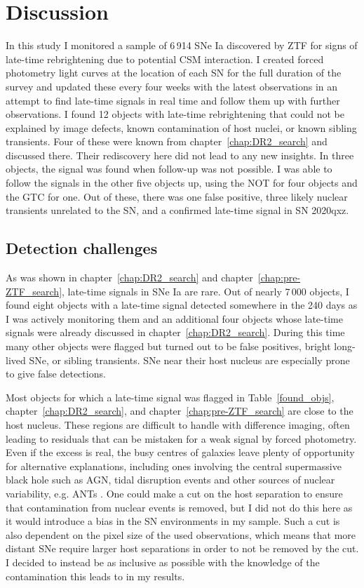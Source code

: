 \documentclass[a4paper,oneside,12pt, class=Latex/Classes/PhDthesisPSnPDF, crop=false]{standalone}
\begin{document}
\section{Discussion}
\label{discussion}
In this study I monitored a sample of 6\,914 SNe Ia discovered by ZTF for signs of late-time rebrightening due to potential CSM interaction. I created forced photometry light curves at the location of each SN for the full duration of the survey and updated these every four weeks with the latest observations in an attempt to find late-time signals in real time and follow them up with further observations. I found 12 objects with late-time rebrightening that could not be explained by image defects, known contamination of host nuclei, or known sibling transients. Four of these were known from chapter~\ref{chap:DR2_search} and discussed there. Their rediscovery here did not lead to any new insights. In three objects, the signal was found when follow-up was not possible. I was able to follow the signals in the other five objects up, using the NOT for four objects and the GTC for one. Out of these, there was one false positive, three likely nuclear transients unrelated to the SN, and a confirmed late-time signal in SN 2020qxz.


\subsection{Detection challenges}
As was shown in chapter~\ref{chap:DR2_search} and chapter~\ref{chap:pre-ZTF_search}, late-time signals in SNe Ia are rare. Out of nearly 7\,000 objects, I found eight objects with a late-time signal detected somewhere in the 240 days as I was actively monitoring them and an additional four objects whose late-time signals were already discussed in chapter~\ref{chap:DR2_search}. During this time many other objects were flagged but turned out to be false positives, bright long-lived SNe, or sibling transients. SNe near their host nucleus are especially prone to give false detections.

Most objects for which a late-time signal was flagged in Table~\ref{found_objs}, chapter~\ref{chap:DR2_search}, and chapter~\ref{chap:pre-ZTF_search} are close to the host nucleus. These regions are difficult to handle with difference imaging, often leading to residuals that can be mistaken for a weak signal by forced photometry. Even if the excess is real, the busy centres of galaxies leave plenty of opportunity for alternative explanations, including ones involving the central supermassive black hole such as AGN, tidal disruption events and other sources of nuclear variability, e.g. ANTs \citep{2020ohl_Hinkle}. One could make a cut on the host separation to ensure that contamination from nuclear events is removed, but I did not do this here as it would introduce a bias in the SN environments in my sample. Such a cut is also dependent on the pixel size of the used observations, which means that more distant SNe require larger host separations in order to not be removed by the cut. I decided to instead be as inclusive as possible with the knowledge of the contamination this leads to in my results.
\end{document}
